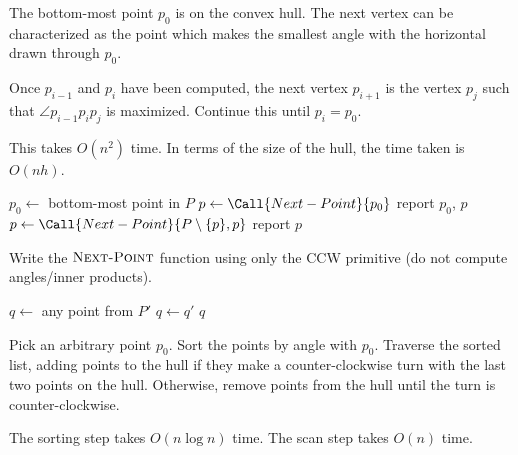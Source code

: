 \begin{solution}
    The bottom-most point $p_0$ is on the convex hull.
    The next vertex can be characterized as the point which makes the
    smallest angle with the horizontal drawn through $p_0$.

    Once $p_{i-1}$ and $p_i$ have been computed, the next vertex $p_{i+1}$
    is the vertex $p_j$ such that $\angle p_{i-1} p_i p_j$ is maximized.
    Continue this until $p_i = p_0$.

    This takes $O(n^2)$ time.
    In terms of the size of the hull, the time taken is $O(nh)$.
    \begin{algo}
            \State $p_0 \gets$ bottom-most point in $P$
            \State $p \gets \Call{Next-Point}{p_0}$
            \State report $p_0$, $p$
                \State $p \gets \Call{Next-Point}{P \setminus \set p, p}$
                \State report $p$
            \EndWhile
        \EndFn
    \end{algo}
\end{solution}
\begin{exercise}
    Write the $\textsc{Next-Point}$ function using only the \textsc{CCW}
    primitive (do not compute angles/inner products).
\end{exercise}
\begin{solution}
    \begin{algo}
            \State $q \gets$ any point from $P'$
                    \State $q \gets q'$
                \EndIf
            \EndFor
            \State \Return $q$
        \EndFn
    \end{algo}
\end{solution}

\begin{solution}
    Pick an arbitrary point $p_0$.
    Sort the points by angle with $p_0$.
    Traverse the sorted list, adding points to the hull if they make a
    counter-clockwise turn with the last two points on the hull.
    Otherwise, remove points from the hull until the turn is
    counter-clockwise.

    The sorting step takes $O(n \log n)$ time.
    The scan step takes $O(n)$ time.
\end{solution}
